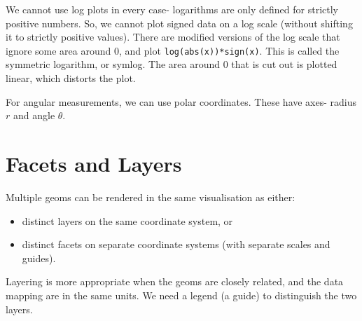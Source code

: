 \documentclass[a4paper, openany]{memoir}
\begin{document}
We cannot use log plots in every case- logarithms are only defined for strictly positive numbers. So, we cannot plot signed data on a log scale (without shifting it to strictly positive values). There are modified versions of the log scale that ignore some area around 0, and plot \texttt{log(abs(x))*sign(x)}. This is called the symmetric logarithm, or symlog. The area around 0 that is cut out is plotted linear, which distorts the plot.

For angular measurements, we can use polar coordinates. These have axes- radius $r$ and angle $\theta$.
\newpage

\section{Facets and Layers}
Multiple geoms can be rendered in the same visualisation as either:
\begin{itemize}
    \item distinct layers on the same coordinate system, or
    \item distinct facets on separate coordinate systems (with separate scales and guides).
\end{itemize}
Layering is more appropriate when the geoms are closely related, and the data mapping are in the same units. We need a legend (a guide) to distinguish the two layers.
\end{document}
